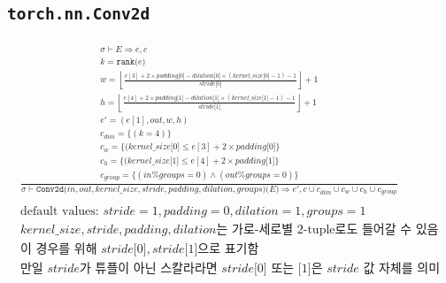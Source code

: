 \documentclass{article}
\newcommand{\x}{\times}
\newcommand{\rem}{\mtt{\%}}
\newcommand{\Rar}{\Rightarrow}
\newcommand{\mtt}[1]{\mathtt{#1}}
\newcommand{\op}[2]{\mtt{#1(}#2\mtt{)}}
\newcommand{\module}[3]{\mtt{#1(}#2\mtt{)(}#3\mtt{)}}
\newcommand{\ind}[1]{\mtt{[}#1\mtt{]}}
\begin{document}
\subsection*{\texttt{torch.nn.Conv2d}}%
\begin{align*}
  \frac
  {
    \begin{array}{l}
      \sigma \vdash E \Rar e, c \\
      k = \op{rank}{e} \\
      w = \left\lfloor \frac{e[3] + 2 \x padding \ind{0} - dilation \ind{0}
        \x (kernel\_size \ind{0} - 1) - 1}{stride \ind{0}} \right\rfloor + 1 \\
      h = \left\lfloor \frac{e[4] + 2 \x padding \ind{1} - dilation \ind{1}
        \x (kernel\_size \ind{1} - 1) - 1}{stride \ind{1}} \right\rfloor + 1 \\
      e' = (e[1], out, w, h) \\
      c_{dim} = \{ (k = 4) \} \\
      c_w = \{ (kernel\_size\ind{0} \leq e[3] + 2 \x padding \ind{0} \} \\
      c_h = \{ (kernel\_size\ind{1} \leq e[4] + 2 \x padding \ind{1} \} \\
      c_{group} = \{ (in \rem groups = 0) \land (out \rem groups = 0) \}
    \end{array}
  }
  {
    \sigma \vdash \module{Conv2d}{in, out, kernel\_size, stride, padding,
      dilation, groups}{E} \Rar e', c \cup c_{dim} \cup c_w \cup c_h \cup
      c_{group}
  } \\
  \\
  \text{default values: $stride=1, padding=0, dilation=1, groups=1$} \\
  \text{$kernel\_size, stride, padding, dilation$는 가로-세로별 2-tuple로도 들어갈
  수 있음} \\
  \text{이 경우를 위해 $stride\ind{0}, stride\ind{1}$으로 표기함} \\
  \text{만일 $stride$가 튜플이 아닌 스칼라라면 $stride\ind{0}$ 또는 $\ind{1}$은
    $stride$ 값 자체를 의미}
\end{align*}%
\end{document}
